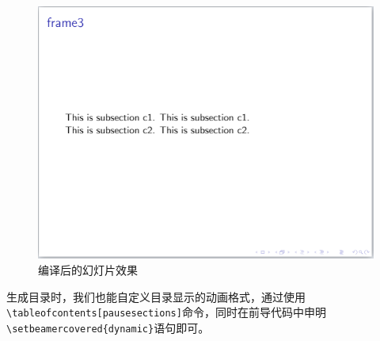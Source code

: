 \begin{figure}[htbp]
    \includegraphics[width = 0.45\linewidth]{images/ch_9/NEWexample12_6.png}
    \caption{编译后的幻灯片效果}
    \label{fig:908}
\end{figure}

生成目录时，我们也能自定义目录显示的动画格式，通过使用\texttt{\textbackslash{}tableofcontents[pausesections]}命令，同时在前导代码中申明\texttt{\textbackslash{}setbeamercovered\{dynamic\}}语句即可。

